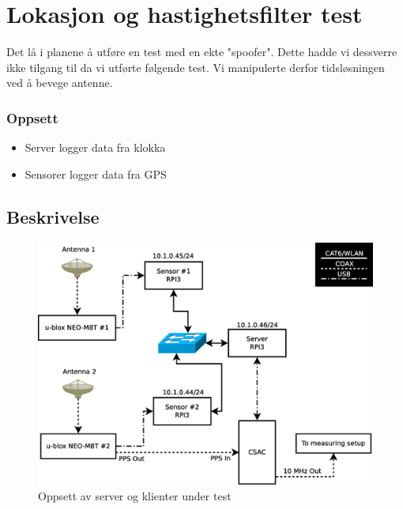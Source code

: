 \documentclass[xcolor=table]{beamer}
\begin{document}
\section{Lokasjon og hastighetsfilter test}
\begin{frame}
Det lå i planene å utføre en test med en ekte "spoofer". Dette hadde vi dessverre ikke tilgang til da vi utførte følgende test. Vi manipulerte derfor tidsløsningen ved å bevege antenne.
\frametitle{Oppsett}
  \begin{itemize}
    \item Server logger data fra klokka
    \item Sensorer logger data fra GPS
  \end{itemize}
  \subsection{Beskrivelse}
      \begin{figure}
        \includegraphics[scale=0.25]{thesis/graphics/server_layout.eps}
        \caption{Oppsett av server og klienter under test}
      \end{figure}
\end{frame}
\end{document}
